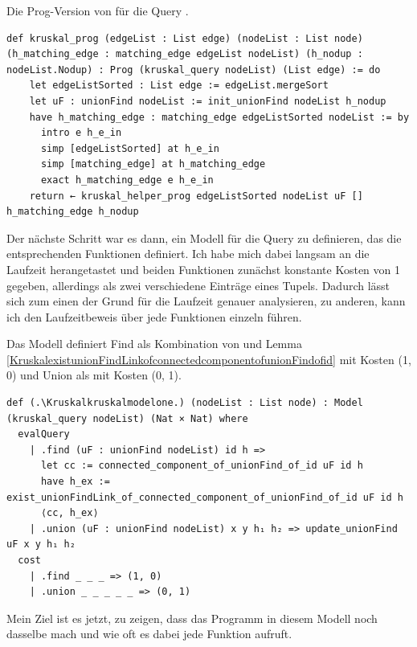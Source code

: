 \begin{definition}[\Kruskalkruskalprog]
  Die Prog-Version von \Kruskalkruskal für die Query \Kruskalkruskalquery.
\end{definition}
\begin{lstlisting}
def kruskal_prog (edgeList : List edge) (nodeList : List node) (h_matching_edge : matching_edge edgeList nodeList) (h_nodup : nodeList.Nodup) : Prog (kruskal_query nodeList) (List edge) := do
    let edgeListSorted : List edge := edgeList.mergeSort
    let uF : unionFind nodeList := init_unionFind nodeList h_nodup
    have h_matching_edge : matching_edge edgeListSorted nodeList := by
      intro e h_e_in
      simp [edgeListSorted] at h_e_in
      simp [matching_edge] at h_matching_edge
      exact h_matching_edge e h_e_in
    return ← kruskal_helper_prog edgeListSorted nodeList uF [] h_matching_edge h_nodup
\end{lstlisting}

Der nächste Schritt war es dann, ein Modell für die Query zu definieren, das die entsprechenden Funktionen definiert.
Ich habe mich dabei langsam an die Laufzeit herangetastet und beiden Funktionen zunächst konstante Kosten von 1 gegeben,
allerdings als zwei verschiedene Einträge eines Tupels.
Dadurch lässt sich zum einen der Grund für die Laufzeit genauer analysieren,
zu anderen, kann ich den Laufzeitbeweis über jede Funktionen einzeln führen.

\begin{definition}[\Kruskalkruskalmodelone]
  Das Modell definiert Find als Kombination von \KruskalconnectedcomponentofunionFindofid und Lemma \ref{KruskalexistunionFindLinkofconnectedcomponentofunionFindofid} mit Kosten (1, 0)
  und Union als \KruskalupdateunionFind mit Kosten (0, 1).
\end{definition}
\begin{lstlisting}
def (.\Kruskalkruskalmodelone.) (nodeList : List node) : Model (kruskal_query nodeList) (Nat × Nat) where
  evalQuery
    | .find (uF : unionFind nodeList) id h =>
      let cc := connected_component_of_unionFind_of_id uF id h
      have h_ex := exist_unionFindLink_of_connected_component_of_unionFind_of_id uF id h
      ⟨cc, h_ex⟩
    | .union (uF : unionFind nodeList) x y h₁ h₂ => update_unionFind uF x y h₁ h₂
  cost
    | .find _ _ _ => (1, 0)
    | .union _ _ _ _ _ => (0, 1)
\end{lstlisting}

Mein Ziel ist es jetzt, zu zeigen, dass das Programm in diesem Modell noch dasselbe mach und wie oft es dabei jede Funktion aufruft.

